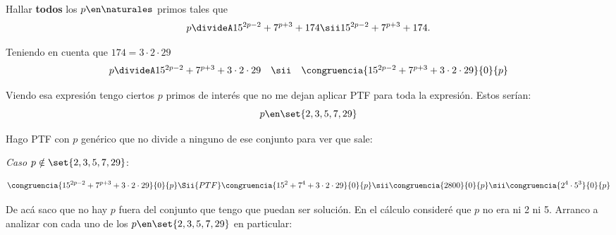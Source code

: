 \begin{enunciado}{\ejExtra}
  Hallar \textbf{todos} los $p \en \naturales$ primos tales que
  $$
    p \divideA 15^{2p-2} + 7^{p+3} + 174
    \sii
    15^{2p-2} + 7^{p+3} + 174.
  $$
\end{enunciado}

Teniendo en cuenta que $174 = 3 \cdot 2 \cdot 29$
$$
  \begin{array}{rcl}
    p \divideA 15^{2p-2} + 7^{p+3} + 3 \cdot 2 \cdot 29
     & \sii &
    \congruencia{15^{2p-2} + 7^{p+3} +3 \cdot 2 \cdot 29}{0}{p}
  \end{array}
$$

Viendo esa expresión tengo ciertos $p$ primos de interés que no me dejan aplicar PTF para toda la expresión. Estos serían:
$$
  p \en \set{2, 3, 5, 7, 29}
$$

Hago PTF con $p$ genérico que no divide a ninguno de ese conjunto para ver que sale:

\textit{Caso $p \notin\set{2, 3, 5, 7, 29}$}:\par
$$
  \congruencia{15^{2p-2} + 7^{p+3} +3 \cdot 2 \cdot 29}{0}{p}
  \Sii{PTF}
  \congruencia{15^2 + 7^4 + 3 \cdot 2 \cdot 29}{0}{p}
  \sii
  \congruencia{2800}{0}{p}
  \sii
  \congruencia{2^4 \cdot 5^3}{0}{p}
$$

De acá saco que no hay $p$ fuera del conjunto que tengo que puedan ser solución.
En el cálculo consideré que $p$ no era ni 2 ni 5. Arranco a analizar con cada uno de los  $p \en \set{2, 3, 5, 7, 29}$ en particular:

